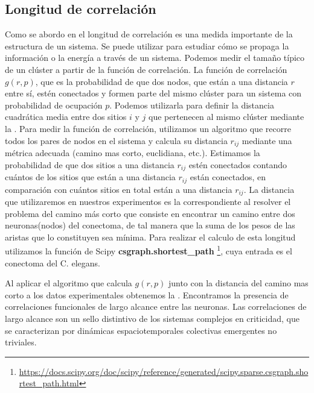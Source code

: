  
 
 
 \subsection{Longitud de correlación}
 
Como se abordo en el   longitud de correlación es una medida importante de la estructura de un sistema. Se puede utilizar para estudiar cómo se propaga la información o la energía a través de un sistema.  Podemos medir el tamaño típico de un clúster a partir de la función de correlación. La función de correlación $g(r, p)$, que es la probabilidad de que dos nodos, que están a una distancia $r$ entre sí, estén conectados y formen parte del mismo clúster para un sistema con probabilidad de ocupación $p$. Podemos utilizarla para definir la distancia cuadrática media entre dos sitios $i$ y $j$ que pertenecen al mismo clúster mediante la .  Para medir la función de correlación, utilizamos un algoritmo que recorre todos los pares de nodos en el sistema y calcula su distancia $r_{ij}$ mediante una métrica adecuada (camino mas corto, euclidiana, etc.).  Estimamos la probabilidad de que dos sitios a una distancia $r_{ij}$ estén conectados contando cuántos de los sitios que están a una distancia $r_{ij}$ están conectados, en comparación con cuántos sitios en total están a una distancia $r_{ij}$.  La distancia que utilizaremos en nuestros experimentos es la correspondiente al resolver el  problema del camino más corto que consiste  en encontrar un camino entre dos neuronas(nodos) del conectoma, de tal manera que la suma de los pesos de las aristas que lo constituyen sea mínima. Para realizar el calculo de esta longitud utilizamos la función de Scipy \textbf{csgraph.shortest\_path} \footnote{\url{https://docs.scipy.org/doc/scipy/reference/generated/scipy.sparse.csgraph.shortest_path.html}}, cuya entrada es el conectoma del C. elegans. 
 
 Al aplicar el algoritmo que calcula $g(r,p)$ junto con la distancia del camino mas corto a los datos experimentales obtenemos la .   Encontramos la presencia de correlaciones funcionales de largo alcance entre las neuronas.   Las correlaciones  de largo alcance son un sello distintivo de los sistemas complejos en criticidad, que se caracterizan por dinámicas espaciotemporales colectivas emergentes no triviales.
 
